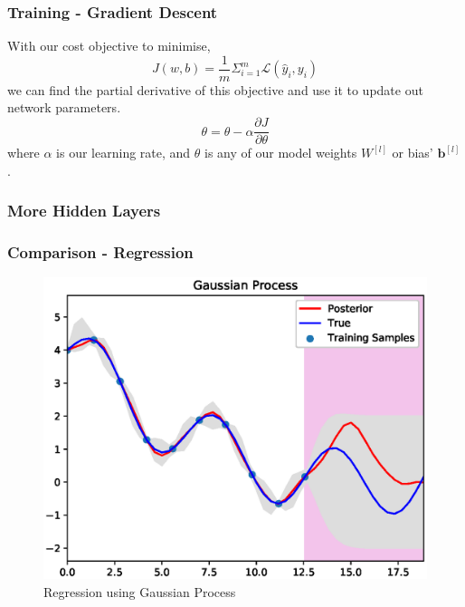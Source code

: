 \documentclass{beamer}
\newcommand{\mb}[1]{\mathbf{#1}}
\begin{document}
% 
% 
% 
% 
\begin{frame}
  \frametitle{Training - Gradient Descent}
  With our cost objective to minimise,
  \begin{equation*}
    J(w,b) =\frac{1}{m} \Sigma_{i=1}^{m}\mathcal{L}(\hat{y}_i, y_i)
  \end{equation*}
  we can find the partial derivative of this objective and use it to update out network parameters.
  \begin{equation*}
    \theta = \theta - \alpha \dfrac{\partial J}{\partial \theta}
  \end{equation*}
  where $\alpha$ is our learning rate, and $\theta$ is any of our model weights $W^{[l]}$ or bias' $\mb{b}^{[l]}$.
\end{frame}
% 
% 
% 
% 
\begin{frame}
  \frametitle{More Hidden Layers}
  
\end{frame}
% 
% 
% 
% 
\begin{frame}
  \frametitle{Comparison - Regression}
  \vspace*{-0.15cm}
  \begin{figure}[!h]
    \centering
    \includegraphics[width=0.8\linewidth]{./figs/gp.eps}
    \caption{Regression using Gaussian Process}
    \label{fig:gp}
  \end{figure}
\end{frame}
% 
% 
% 
% 
\end{document}
